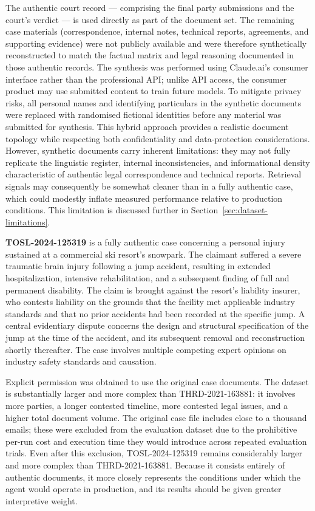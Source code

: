 The authentic court record — comprising the final party submissions and the court's verdict — is used directly as part of the document set. The remaining case materials (correspondence, internal notes, technical reports, agreements, and supporting evidence) were not publicly available and were therefore synthetically reconstructed to match the factual matrix and legal reasoning documented in those authentic records. The synthesis was performed using Claude.ai's consumer interface rather than the professional API; unlike API access, the consumer product may use submitted content to train future models. To mitigate privacy risks, all personal names and identifying particulars in the synthetic documents were replaced with randomised fictional identities before any material was submitted for synthesis. This hybrid approach provides a realistic document topology while respecting both confidentiality and data-protection considerations. However, synthetic documents carry inherent limitations: they may not fully replicate the linguistic register, internal inconsistencies, and informational density characteristic of authentic legal correspondence and technical reports. Retrieval signals may consequently be somewhat cleaner than in a fully authentic case, which could modestly inflate measured performance relative to production conditions. This limitation is discussed further in Section~\ref{sec:dataset-limitations}.

\textbf{TOSL-2024-125319} is a fully authentic case concerning a personal injury sustained at a commercial ski resort's snowpark. The claimant suffered a severe traumatic brain injury following a jump accident, resulting in extended hospitalization, intensive rehabilitation, and a subsequent finding of full and permanent disability. The claim is brought against the resort's liability insurer, who contests liability on the grounds that the facility met applicable industry standards and that no prior accidents had been recorded at the specific jump. A central evidentiary dispute concerns the design and structural specification of the jump at the time of the accident, and its subsequent removal and reconstruction shortly thereafter. The case involves multiple competing expert opinions on industry safety standards and causation.

Explicit permission was obtained to use the original case documents. The dataset is substantially larger and more complex than THRD-2021-163881: it involves more parties, a longer contested timeline, more contested legal issues, and a higher total document volume. The original case file includes close to a thousand emails; these were excluded from the evaluation dataset due to the prohibitive per-run cost and execution time they would introduce across repeated evaluation trials. Even after this exclusion, TOSL-2024-125319 remains considerably larger and more complex than THRD-2021-163881. Because it consists entirely of authentic documents, it more closely represents the conditions under which the agent would operate in production, and its results should be given greater interpretive weight.


